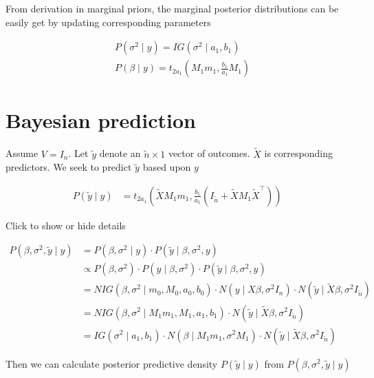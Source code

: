 \documentclass[
]{book}
\theoremstyle{definition}
\theoremstyle{definition}
\theoremstyle{definition}
\theoremstyle{definition}
\theoremstyle{remark}
\begin{document}
From derivation in marginal priors, the marginal posterior distributions can be easily get by updating corresponding parameters

\[
\begin{aligned}
&P\left(\sigma^{2} \mid y\right)=I G\left(\sigma^{2} \mid a_{1}, b_{1}\right) \\
&P(\beta \mid y)=t_{2a_1}(M_1m_1, \frac{b_1}{a_1}M_1)
\end{aligned}
\]

\hypertarget{bayesian-prediction}{%
\section{Bayesian prediction}\label{bayesian-prediction}}

Assume \(V=I_{n}\). Let \(\tilde{y}\) denote an \(\tilde{n}\times 1\) vector of outcomes. \(\tilde{X}\) is corresponding predictors. We seek to predict \(\tilde{y}\) based upon \(y\)

\begin{align}
P(\tilde{y} \mid y) 
&= t_{2a_1}(\tilde{X} M_1 m_1, \frac{b_1}{a_1}(I_{\tilde{n}} + \tilde{X} M_{1} \tilde{X}^{\top})) \;
\end{align}

Click to show or hide details

\begin{align}
P\left(\beta, \sigma^{2}, \tilde{y} \mid y\right) 
&=P\left(\beta, \sigma^{2} \mid y\right) \cdot P\left(\tilde{y} \mid \beta, \sigma^{2}, y\right) \\
& \propto P\left(\beta, \sigma^{2}\right) \cdot P\left(y \mid \beta, \sigma^{2}\right) \cdot P\left(\tilde{y} \mid \beta, \sigma^{2}, y\right) \\
&= NIG \left(\beta, \sigma^{2} \mid m_{0}, M_{0}, a_{0}, b_{0}\right)
\cdot N\left(y \mid X \beta, \sigma^{2} I_{n}\right) 
\cdot N\left(\tilde{y} \mid \tilde{X} \beta, \sigma^{2} I_{\tilde{n}}\right) \\
&= NIG \left(\beta, \sigma^{2} \mid M_{1} m_{1}, M_{1}, a_{1}, b_{1}\right) \cdot N\left(\tilde{y} \mid \tilde{X} \beta, \sigma^{2} I_{\tilde{n}}\right) \\
&= IG(\sigma^{2} \mid a_{1}, b_{1}) \cdot N\left(\beta \mid M_{1} m_{1}, \sigma^{2} M_{1} \right) \cdot N\left(\tilde{y} \mid \tilde{X} \beta, \sigma^{2} I_{\tilde{n}} \right) \;
\end{align}

Then we can calculate posterior predictive density \(P(\tilde{y} \mid y)\) from \(P\left(\beta, \sigma^{2}, \tilde{y} \mid y\right)\)
\end{document}

